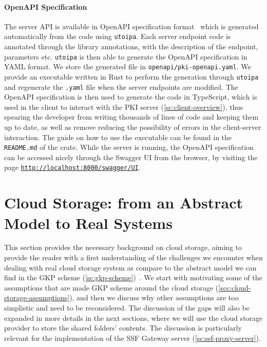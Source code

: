 \paragraph{OpenAPI Specification}
The server API is available in OpenAPI
specification format~\cite{OpenAPISurvey} 
which is generated automatically from the code using
\texttt{utoipa}. Each server endpoint code is
annotated through the library annotations, with the description
of the endpoint, parameters etc. \texttt{utoipa} is then
able to generate the OpenAPI specification in YAML format.
We store the generated file in \texttt{openapi/pki-openapi.yaml}.
We provide an executable written in Rust to perform the generation
through \texttt{utoipa} and regenerate the \texttt{.yaml}
file when the server endpoints are modified.
The OpenAPI specification is then used to generate the
code in TypeScript, which is used in the client to interact
with the PKI server (\cref{sc:client-overview}), thus spearing
the developer from writing thousands of lines of code and keeping them up to date, 
as well as remove reducing the possibility of errors in the client-server interaction. 
The guide on how to use the executable can be found in the \texttt{README.md}
of the crate.
While the server is running, the OpenAPI specification can be
accessed nicely through the Swagger UI from the browser, 
by visiting the page \texttt{\url{http://localhost:8000/swagger/UI}}.

\section{Cloud Storage: from an Abstract Model to Real Systems}\label{sc:cloud-storage}

This section provides the necessary background on cloud storage,
aiming to provide the reader with a first understanding of the challenges
we encounter when dealing with real cloud storage system
as compare to the abstract model we can find in the GKP scheme (\cref{sc:gkp-scheme})~\cite{GKP}.
We start with motivating some of the assumptions that are made
GKP scheme around the cloud storage (\cref{scc:cloud-storage-assumptions}), and then we discuss why
other assumptions are too simplistic and need to be reconsidered.
The discussion of the gaps will also be expanded in more details in the next sections,
where we will use the cloud storage provider to store the shared folders' contents.
The discussion is particularly relevant for the implementation of the
SSF Gateway server (\cref{sc:ssf-proxy-server}).

